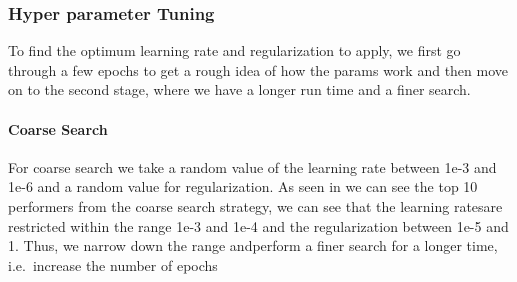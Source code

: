 \documentclass[11pt]{article}
\begin{document}
    \hypertarget{hyper-parameter-tuning}{%
\subsubsection{Hyper parameter Tuning}\label{hyper-parameter-tuning}}

To find the optimum learning rate and regularization to apply, we first
go through a few epochs to get a rough idea of how the params work and
then move on to the second stage, where we have a longer run time and a
finer search.

\hypertarget{coarse-search}{%
\paragraph{Coarse Search}\label{coarse-search}}

For coarse search we take a random value of the learning rate between
1e-3 and 1e-6 and a random value for regularization. As seen in we can
see the top 10 performers from the coarse search strategy, we can see
that the learning ratesare restricted within the range 1e-3 and 1e-4 and
the regularization between 1e-5 and 1. Thus, we narrow down the range
andperform a finer search for a longer time, i.e.~increase the number of
epochs
\end{document}
